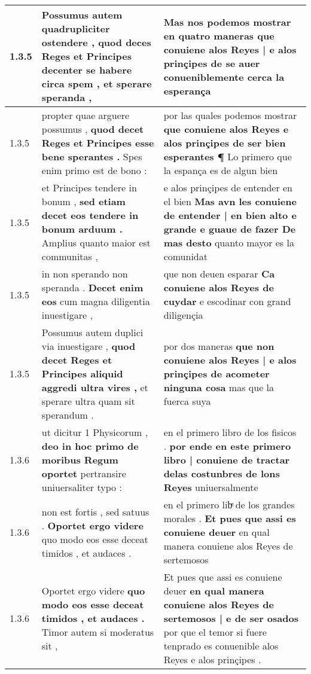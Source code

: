 \begin{tabular}{|p{1cm}|p{6.5cm}|p{6.5cm}|}
1.3.5 & Possumus autem quadrupliciter ostendere , \textbf{ quod deces Reges et Principes decenter se habere circa spem , } et sperare speranda , & Mas nos podemos mostrar en quatro maneras \textbf{ que conuiene alos Reyes | e alos prinçipes de se auer } conueniblemente cerca la esperança \\\hline
1.3.5 & propter quae arguere possumus , \textbf{ quod decet Reges et Principes esse bene sperantes . } Spes enim primo est de bono : & por las quales podemos mostrar \textbf{ que conuiene alos Reyes e alos prinçipes de ser bien esperantes ¶ } Lo primero que la espança es de algun bien \\\hline
1.3.5 & et Principes tendere in bonum , \textbf{ sed etiam decet eos tendere in bonum arduum . } Amplius quanto maior est communitas , & e alos prinçipes de entender en el bien \textbf{ Mas avn les conuiene de entender | en bien alto e grande e guaue de fazer De mas desto } quanto mayor es la comunidat \\\hline
1.3.5 & in non sperando non speranda . \textbf{ Decet enim eos } cum magna diligentia inuestigare , & que non deuen esparar \textbf{ Ca conuiene alos Reyes de cuydar } e escodinar con grand diligençia \\\hline
1.3.5 & Possumus autem duplici via inuestigare , \textbf{ quod decet Reges et Principes aliquid aggredi ultra vires , } et sperare ultra quam sit sperandum . & por dos maneras \textbf{ que non conuiene alos Reyes | e alos prinçipes de acometer ninguna cosa } mas que la fuerca suya \\\hline
1.3.6 & ut dicitur 1 Physicorum , \textbf{ deo in hoc primo de moribus Regum oportet } pertransire uniuersaliter typo : & en el primero libro de los fisicos . \textbf{ por ende en este primero libro | conuiene de tractar delas costunbres de lons Reyes } uniuersalmente \\\hline
1.3.6 & non est fortis , sed satuus . \textbf{ Oportet ergo videre } quo modo eos esse deceat timidos , et audaces . & en el primero libͤ de los grandes morales . \textbf{ Et pues que assi es conuiene deuer } en qual manera conuiene alos Reyes de sertemosos \\\hline
1.3.6 & Oportet ergo videre \textbf{ quo modo eos esse deceat timidos , et audaces . } Timor autem si moderatus sit , & Et pues que assi es conuiene deuer \textbf{ en qual manera conuiene alos Reyes de sertemosos | e de ser osados } por que el temor si fuere tenprado es conuenible alos Reyes e alos prinçipes . \\\hline

\end{tabular}
